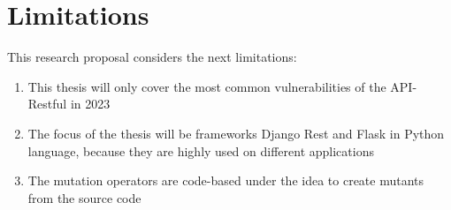
\section{Limitations}

This research proposal considers the next limitations:

\begin{enumerate}
    \item This thesis will only cover the most common vulnerabilities of the API-Restful in 2023
    \item The focus of the thesis will be frameworks Django Rest and Flask in Python language, because they are highly used on different applications
    \item The mutation operators are code-based under the idea to create mutants from the source code
\end{enumerate}